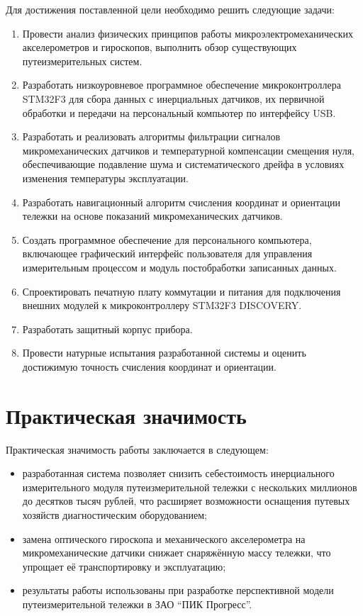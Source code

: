 Для достижения поставленной цели необходимо решить следующие задачи:
\begin{enumerate}
	\item Провести анализ физических принципов работы микроэлектромеханических акселерометров и гироскопов, выполнить обзор существующих путеизмерительных систем.
	\item Разработать низкоуровневое программное обеспечение микроконтроллера STM32F3 для сбора данных с инерциальных датчиков, их первичной обработки и передачи на персональный компьютер по интерфейсу USB.
	\item Разработать и реализовать алгоритмы фильтрации сигналов микромеханических датчиков и температурной компенсации смещения нуля, обеспечивающие подавление шума и систематического дрейфа в условиях изменения температуры эксплуатации.
	\item Разработать навигационный алгоритм счисления координат и ориентации тележки на основе показаний микромеханических датчиков.
	\item Создать программное обеспечение для персонального компьютера, включающее графический интерфейс пользователя для управления измерительным процессом и модуль постобработки записанных данных.
	\item Спроектировать печатную плату коммутации и питания для подключения внешних модулей к микроконтроллеру STM32F3 DISCOVERY.
	\item Разработать защитный корпус прибора.
	\item Провести натурные испытания разработанной системы и оценить достижимую точность счисления координат и ориентации.
\end{enumerate}
\section*{Практическая значимость}

Практическая значимость работы заключается в следующем:
\begin{itemize}
	\item разработанная система позволяет снизить себестоимость инерциального измерительного модуля путеизмерительной тележки с нескольких миллионов до десятков тысяч рублей, что расширяет возможности оснащения путевых хозяйств диагностическим оборудованием;
	\item замена оптического гироскопа и механического акселерометра на микромеханические датчики снижает снаряжённую массу тележки, что упрощает её транспортировку и эксплуатацию;
	\item результаты работы использованы при разработке перспективной модели путеизмерительной тележки в ЗАО \enquote{ПИК Прогресс}.
\end{itemize}

